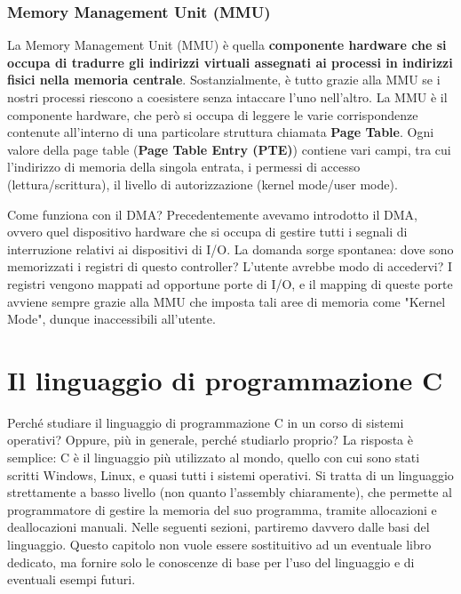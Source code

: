 \documentclass[12pt]{report}
\begin{document}
	\subsection{Memory Management Unit (MMU)}
	La Memory Management Unit (MMU) è quella \textbf{componente hardware che si occupa di tradurre gli indirizzi virtuali assegnati ai processi in indirizzi fisici nella memoria centrale}. 
	Sostanzialmente, è tutto grazie alla MMU se i nostri processi riescono a coesistere senza intaccare l'uno nell'altro.
	La MMU è il componente hardware, che però si occupa di leggere le varie corrispondenze contenute all'interno di una particolare struttura chiamata \textbf{Page Table}. Ogni valore della page table (\textbf{Page Table Entry (PTE)}) contiene vari campi, tra cui l'indirizzo di memoria della singola entrata, i permessi di accesso (lettura/scrittura), il livello di autorizzazione (kernel mode/user mode).
	
	\begin{osservazione}{Come funziona con il DMA?}{}
		Precedentemente avevamo introdotto il DMA, ovvero quel dispositivo hardware che si occupa di gestire tutti i segnali di interruzione relativi ai dispositivi di I/O.
		La domanda sorge spontanea: dove sono memorizzati i registri di questo controller? L'utente avrebbe modo di accedervi?
		\smallbreak
		I registri vengono mappati ad opportune porte di I/O, e il mapping di queste porte avviene sempre grazie alla MMU che imposta tali aree di memoria come "Kernel Mode", dunque inaccessibili all'utente.
	\end{osservazione}
	
	\chapter{Il linguaggio di programmazione C}
	Perché studiare il linguaggio di programmazione C in un corso di sistemi operativi? Oppure, più in generale, perché studiarlo proprio?
	La risposta è semplice: C è il linguaggio più utilizzato al mondo, quello con cui sono stati scritti Windows, Linux, e quasi tutti i sistemi operativi. Si tratta di un linguaggio strettamente a basso livello (non quanto l'assembly chiaramente), che permette al programmatore di gestire la memoria del suo programma, tramite allocazioni e deallocazioni manuali.
	Nelle seguenti sezioni, partiremo davvero dalle basi del linguaggio. Questo capitolo non vuole essere sostituitivo ad un eventuale libro dedicato, ma fornire solo le conoscenze di base per l'uso del linguaggio e di eventuali esempi futuri.
	
\end{document}
